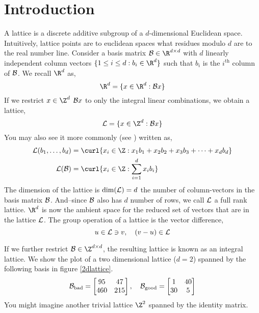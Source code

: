 \documentclass{homework}
\begin{document}
\begin{abstract}
  \blindtext
\end{abstract}
\maketitle

\section{Introduction}\label{intro}

A lattice is a discrete additive subgroup of a $d$-dimensional
Euclidean space. Intuitively, lattice points are to euclidean spaces
what residues modulo $d$ are to the real number line. Consider a basis
matrix $\B \in \R^{d \times d}$ with $d$ linearly independent column
vectors $\{1 \leq i \leq d : b_i \in \R^d\}$ such that $b_i$ is the
$i^\text{th}$ column of $\mathcal{B}$. We recall $\R^d$ as,
\[
  \R^d = \{x \in \R^d : \B x\}
\]
If we restrict $x\in \Z^d$ \ie $\mathcal{B} x$ to only the integral linear
combinations, we obtain a lattice,
\[
  \L = \{x \in \Z^d : \B x\}
\]
You may also see it more commonly (see
\cite{micciancio2002complexity}) written as,
\begin{align*}
  \L(b_1,\dots,b_d)
         & = \curl{x_i \in \Z : x_1b_1 + x_2b_2 + x_3b_3 + \cdots + x_db_d} \\
  \L(\B) & = \curl{x_i \in \Z : \sum_{i=1}^{d}x_ib_i}
\end{align*}
The dimension of the lattice is $\dim(\mathcal{L}) = d$ \ie the number of
column-vectors in the basis matrix $\mathcal{B}$. And--since $\mathcal{B}$ also has $d$
number of rows, we call $\mathcal{L}$ a full rank lattice. $\R^d$ is now the
ambient space for the reduced set of vectors that are in the lattice
$\mathcal{L}$. The group operation of a lattice is the vector difference,
\[
  u \in \mathcal{L} \ni v,\quad (v - u) \in \mathcal{L}
\]

If we further restrict $\B \in \Z^{d \times d}$, the resulting lattice
is known as an integral lattice. We show the plot of a two dimensional
lattice ($d=2$) spanned by the following basis in figure
\ref{2dlattice}.
\[
  \mathcal{B}_\text{bad} =
  \begin{bmatrix}
    95  & 47  \\
    460 & 215
  \end{bmatrix},
  \quad
  \mathcal{B}_\text{good} =
  \begin{bmatrix}
    1  & 40 \\
    30 & 5
  \end{bmatrix}
\]
You might imagine another trivial lattice $\Z^2$ spanned by the
identity matrix.
\end{document}
